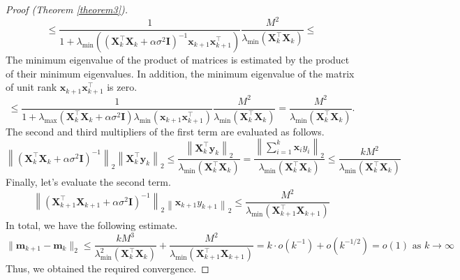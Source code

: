 \documentclass[
11pt,%
tightenlines,%
twoside,%
onecolumn,%
nofloats,%
nobibnotes,%
nofootinbib,%
superscriptaddress,%
noshowpacs,%
centertags]%
{revtex4-2}
\begin{document}
\begin{proof}[Proof (Theorem \ref{theorem3})]
    \[ \leqslant \dfrac{1}{1 + \lambda_{\min}\left(\left( \mathbf{X}_k^{\top} \mathbf{X}_k + \alpha \sigma^2 \mathbf{I} \right)^{-1} \mathbf{x}_{k+1} \mathbf{x}_{k+1}^{\top} \right)} \dfrac{M^2}{\lambda_{\min}\left( \mathbf{X}_k^{\top} \mathbf{X}_k \right)} \leqslant \]
    The minimum eigenvalue of the product of matrices is estimated by the product of their minimum eigenvalues. In addition, the minimum eigenvalue of the matrix of unit rank $\mathbf{x}_{k+1}\mathbf{x}_{k+1}^{\top}$ is zero.
    \[ \leqslant \dfrac{1}{1 + \lambda_{\max}\left( \mathbf{X}_k^{\top} \mathbf{X}_k + \alpha \sigma^2 \mathbf{I} \right) \lambda_{\min}\left( \mathbf{x}_{k+1} \mathbf{x}_{k+1}^{\top} \right)} \dfrac{M^2}{\lambda_{\min}\left( \mathbf{X}_k^{\top} \mathbf{X}_k \right)} = \dfrac{M^2}{\lambda_{\min}\left( \mathbf{X}_k^{\top} \mathbf{X}_k \right)}. \]
The second and third multipliers of the first term are evaluated as follows.
    \[ \left\| \left( \mathbf{X}_k^{\top} \mathbf{X}_k + \alpha \sigma^2 \mathbf{I} \right)^{-1} \right\|_2 \left\| \mathbf{X}_k^{\top} \mathbf{y}_k \right\|_2 \leqslant \dfrac{\left\| \mathbf{X}_k^{\top} \mathbf{y}_k \right\|_2}{\lambda_{\min}\left( \mathbf{X}_k^{\top} \mathbf{X}_k \right)} = \dfrac{\left\| \sum\limits_{i=1}^{k} \mathbf{x}_i y_i \right\|_2}{\lambda_{\min}\left( \mathbf{X}_k^{\top} \mathbf{X}_k \right)} \leqslant \dfrac{k M^2}{\lambda_{\min}\left( \mathbf{X}_k^{\top} \mathbf{X}_k \right)} \]
    Finally, let's evaluate the second term.
    \[ \left\| \left( \mathbf{X}_{k+1}^{\top} \mathbf{X}_{k+1} + \alpha \sigma^2 \mathbf{I} \right)^{-1} \right\|_2 \left\| \mathbf{x}_{k+1} y_{k+1} \right\|_2 \leqslant \dfrac{M^2}{\lambda_{\min}\left( \mathbf{X}_{k+1}^{\top} \mathbf{X}_{k+1} \right)} \]
    In total, we have the following estimate.
    \[ \| \mathbf{m}_{k+1} - \mathbf{m}_k \|_2 \leqslant \dfrac{k M^3}{\lambda_{\min}^2\left( \mathbf{X}_k^{\top} \mathbf{X}_k \right)} + \dfrac{M^2}{\lambda_{\min}\left( \mathbf{X}_{k+1}^{\top} \mathbf{X}_{k+1} \right)} = k\cdot o(k^{-1}) + o(k^{-1/2}) = o(1) \text{ as } k\to \infty\]
    Thus, we obtained the required convergence.
\end{proof}

%
%
\end{document}
